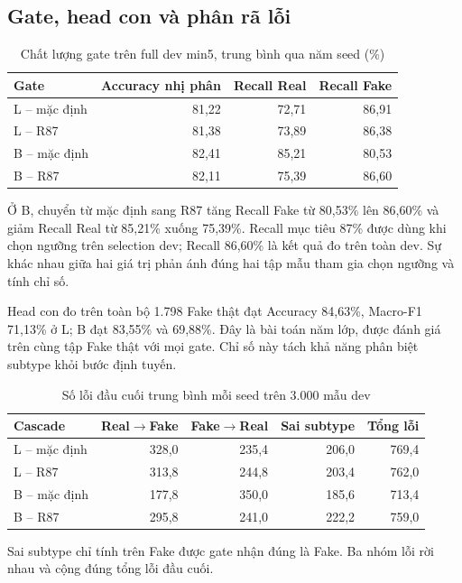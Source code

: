 \documentclass[12pt,a4paper]{article}
\newcommand{\BodySize}{13}
\newcommand{\BodyLeading}{15.6}
\newcommand{\BodyFont}{\fontsize{\BodySize}{\BodyLeading}\selectfont}
\numberwithin{figure}{section}
\numberwithin{table}{section}
\numberwithin{equation}{section}
\begin{document}
\subsection{Gate, head con và phân rã lỗi}
\begin{table}[H]\centering\BodyFont
\caption{Chất lượng gate trên full dev min5, trung bình qua năm seed (\%)}
\begin{tabularx}{\linewidth}{@{}Lrrr@{}}\toprule
Gate & Accuracy nhị phân & Recall Real & Recall Fake\\\midrule
L -- mặc định & 81,22 & 72,71 & 86,91\\
L -- R87 & 81,38 & 73,89 & 86,38\\
B -- mặc định & 82,41 & 85,21 & 80,53\\
B -- R87 & 82,11 & 75,39 & 86,60\\\bottomrule
\end{tabularx}\label{tab:gate-cascade}
\end{table}
Ở B, chuyển từ mặc định sang R87 tăng Recall Fake từ 80,53\% lên 86,60\% và giảm Recall Real từ 85,21\% xuống 75,39\%. Recall mục tiêu 87\% được dùng khi chọn ngưỡng trên selection dev; Recall 86,60\% là kết quả đo trên toàn dev. Sự khác nhau giữa hai giá trị phản ánh đúng hai tập mẫu tham gia chọn ngưỡng và tính chỉ số.

Head con đo trên toàn bộ 1.798 Fake thật đạt Accuracy 84,63\%, Macro-F1 71,13\% ở L; B đạt 83,55\% và 69,88\%. Đây là bài toán năm lớp, được đánh giá trên cùng tập Fake thật với mọi gate. Chỉ số này tách khả năng phân biệt subtype khỏi bước định tuyến.

\begin{table}[H]\centering\BodyFont
\caption{Số lỗi đầu cuối trung bình mỗi seed trên 3.000 mẫu dev}
\begin{tabularx}{\linewidth}{@{}Lrrrr@{}}\toprule
Cascade & Real$\to$Fake & Fake$\to$Real & Sai subtype & Tổng lỗi\\\midrule
L -- mặc định & 328,0 & 235,4 & 206,0 & 769,4\\
L -- R87 & 313,8 & 244,8 & 203,4 & 762,0\\
B -- mặc định & 177,8 & 350,0 & 185,6 & 713,4\\
B -- R87 & 295,8 & 241,0 & 222,2 & 759,0\\\bottomrule
\end{tabularx}\label{tab:routing-errors}
\par\smallskip\begin{minipage}{\linewidth}\BodyFont Sai subtype chỉ tính trên Fake được gate nhận đúng là Fake. Ba nhóm lỗi rời nhau và cộng đúng tổng lỗi đầu cuối.\end{minipage}
\end{table}
\end{document}
